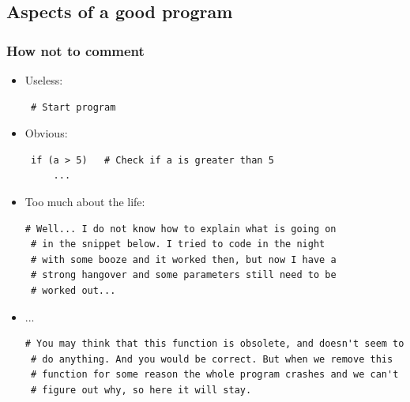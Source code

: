\subsection*{Aspects of a good program}

\begin{frame}[fragile]
  \frametitle{How not to comment}
  \begin{itemize}[<+->]
   \item Useless:
   \begin{lstlisting}
 # Start program 
   \end{lstlisting}
   \item Obvious:
   \begin{lstlisting}
 if (a > 5)   # Check if a is greater than 5
     ... 
 \end{lstlisting}
   \item Too much about the life:
   \begin{lstlisting}[basicstyle=\tiny\ttfamily]
 # Well... I do not know how to explain what is going on
 # in the snippet below. I tried to code in the night 
 # with some booze and it worked then, but now I have a 
 # strong hangover and some parameters still need to be
 # worked out...
   \end{lstlisting}
 
   \item ...
   \begin{lstlisting}[basicstyle=\tiny\ttfamily]
 # You may think that this function is obsolete, and doesn't seem to
 # do anything. And you would be correct. But when we remove this 
 # function for some reason the whole program crashes and we can't 
 # figure out why, so here it will stay.
   \end{lstlisting}
  \end{itemize}
 \end{frame}
 
